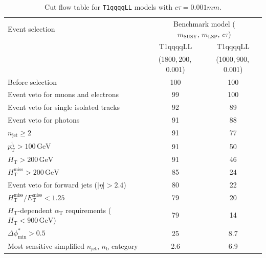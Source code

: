 \begin{table}[!h]
  \caption{Cut flow table for \texttt{T1qqqqLL} models with $c\tau = 0.001\unit{mm}$.} 
  \label{tab:cut_flow_ctau_0p001}
{\scriptsize%
\centering
\begin{tabular}{lcc}
  \hline
  Event selection & \multicolumn{2}{c}{Benchmark model ($m_\mathrm{SUSY},\,m_\mathrm{LSP},\,c\tau$)} \\
  \cline{2-3}
   & T1qqqqLL & T1qqqqLL \\
   & (1800,\,200,\,0.001) & (1000,\,900,\,0.001) \\
  \hline
  Before selection & 100\phantom{.1} & 100\phantom{.1} \\
  Event veto for muons and electrons & \phantom{1}99\phantom{.1} & 100\phantom{.1} \\
  Event veto for single isolated tracks & \phantom{1}92\phantom{.1} & \phantom{1}89\phantom{.1}  \\
  Event veto for photons & \phantom{1}91\phantom{.1} & \phantom{1}88\phantom{.1} \\
   $n_{\mathrm{jet}} \geq 2$ & \phantom{1}91\phantom{.1} & \phantom{1}77\phantom{.1}  \\
   $p_{\mathrm{T}}^{\mathrm{j_1}} > 100\,\mathrm{GeV}$ & \phantom{1}91\phantom{.1} & \phantom{1}50\phantom{.1} \\
   $H_{\mathrm{T}} > 200\,\mathrm{GeV}$ & \phantom{1}91\phantom{.1} & \phantom{1}46\phantom{.1}  \\
  $H_{\mathrm{T}}^{\mathrm{miss}} > 200\,\mathrm{GeV}$ & \phantom{1}85\phantom{.1} & \phantom{1}24\phantom{.1}  \\
  Event veto for forward jets ($|\eta| > 2.4$) & \phantom{1}80\phantom{.1} & \phantom{1}22\phantom{.1}  \\
  $H_{\mathrm{T}}^{\mathrm{miss}} / E_{\mathrm{T}}^{\mathrm{miss}} < 1.25$ & \phantom{1}79\phantom{.1} & \phantom{1}20\phantom{.1}  \\
  $H_{\mathrm{T}}$-dependent $\alpha_{\mathrm{T}}$ requirements ($H_{\mathrm{T}} < 900\,\mathrm{GeV}$) & \phantom{1}79\phantom{.1} & \phantom{1}14\phantom{.1} \\
  $\Delta\phi^{*}_{\mathrm{min}} > 0.5$ & \phantom{1}25\phantom{.1} & \phantom{10}8.7  \\
  \hline
  Most sensitive simplified $n_{\mathrm{jet}}$, $n_{\mathrm{b}}$ category & \phantom{10}2.6 & \phantom{10}6.9 \\
  \hline
\end{tabular}
}
\end{table}

